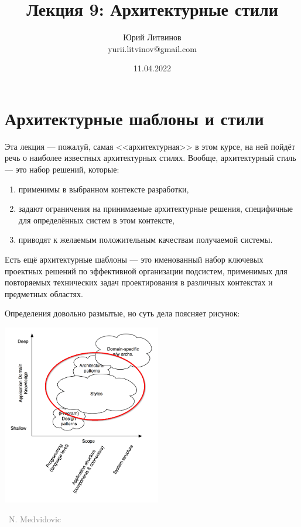 \documentclass[a5paper]{article}
\title{Лекция 9: Архитектурные стили}
\author{Юрий Литвинов\\\small{yurii.litvinov@gmail.com}}
\date{11.04.2022}
\newcommand{\attribution}[1] {
    \vspace{-4mm}\begin{flushright}\begin{scriptsize}\textcolor{gray}
    {\textcopyright\, #1}\end{scriptsize}\end{flushright}
}
\begin{document}
\maketitle
\thispagestyle{empty}

\section{Архитектурные шаблоны и стили}

Эта лекция --- пожалуй, самая <<архитектурная>> в этом курсе, на ней пойдёт речь о наиболее известных архитектурных стилях. Вообще, архитектурный стиль --- это набор решений, которые:

\begin{enumerate}
    \item применимы в выбранном контексте разработки,
    \item задают ограничения на принимаемые архитектурные решения, специфичные для определённых систем в этом контексте,
    \item приводят к желаемым положительным качествам получаемой системы.
\end{enumerate}

Есть ещё архитектурные шаблоны --- это именованный набор ключевых проектных решений по эффективной организации подсистем, применимых для повторяемых технических задач проектирования в различных контекстах и предметных областях.

Определения довольно размытые, но суть дела поясняет рисунок:

\begin{center}
    \includegraphics[width=0.52\textwidth]{architecturalStylesHighlighted.png}
    \attribution{N. Medvidovic}
\end{center}
\end{document}
